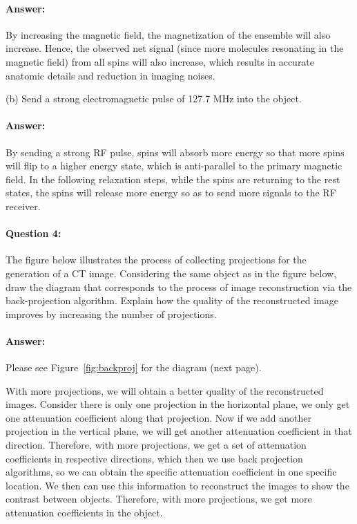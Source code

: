 \documentclass[12pt, letter]{article}
\begin{document}
\paragraph{Answer: } By increasing the magnetic field, the magnetization of the ensemble will also increase. Hence, the observed net signal (since more molecules resonating in the magnetic field) from all spins will also increase, which results in accurate anatomic details and reduction in imaging noises.

(b) Send a strong electromagnetic pulse of 127.7 MHz into the object.

\paragraph{Answer: } By sending a strong RF pulse, spins will absorb more energy so that more spins will flip to a higher energy state, which is anti-parallel to the primary magnetic field. In the following relaxation steps, while the spins are returning to the rest states, the spins will release more energy so as to send more signals to the RF receiver. 

\paragraph{Question 4: } The figure below illustrates the process of collecting projections for the generation of a CT image. Considering the same object as in the figure below, draw the diagram that corresponds to the process of image reconstruction via the back-projection algorithm. Explain how the quality of the reconstructed image improves by increasing the number of projections.

\paragraph{Answer: }
Please see Figure~\ref{fig:backproj} for the diagram (next page). 

With more projections, we will obtain a better quality of the reconstructed images. Consider there is only one projection in the horizontal plane, we only get one attenuation coefficient along that projection. Now if we add another projection in the vertical plane, we will get another attenuation coefficient in that direction. Therefore, with more projections, we get a set of attenuation coefficients in respective directions, which then we use back projection algorithms, so we can obtain the specific attenuation coefficient in one specific location. We then can use this information to reconstruct the images to show the contrast between objects. Therefore, with more projections, we get more attenuation coefficients in the object. 
\end{document}

